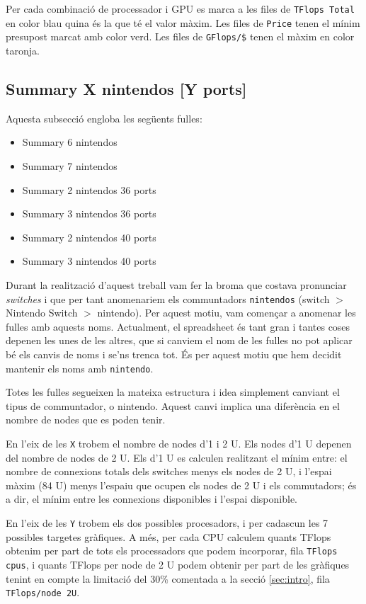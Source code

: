 Per cada combinació de processador i GPU es marca a les files de \texttt{TFlops Total} en color blau quina és la que té el valor màxim. Les files de \texttt{Price} tenen el mínim presupost marcat amb color verd. Les files de \texttt{GFlops/\$} tenen el màxim en color taronja.

\subsection{Summary X nintendos [Y ports]}
Aquesta subsecció engloba les següents fulles:
\begin{itemize}
    \item Summary 6 nintendos
    \item Summary 7 nintendos
    \item Summary 2 nintendos 36 ports
    \item Summary 3 nintendos 36 ports
    \item Summary 2 nintendos 40 ports
    \item Summary 3 nintendos 40 ports
\end{itemize}

Durant la realització d'aquest treball vam fer la broma que costava pronunciar \textit{switches} i que per tant anomenariem els communtadors \texttt{nintendos} (switch $>$ Nintendo Switch $>$ nintendo). Per aquest motiu, vam començar a anomenar les fulles amb aquests noms.
Actualment, el spreadsheet és tant gran i tantes coses depenen les unes de les altres, que si canviem el nom de les fulles no pot aplicar bé els canvis de noms i se'ns trenca tot. És per aquest motiu que hem decidit mantenir els noms amb \texttt{nintendo}.

Totes les fulles segueixen la mateixa estructura i idea simplement canviant el tipus de communtador, o nintendo. Aquest canvi implica una diferència en el nombre de nodes que es poden tenir.

En l'eix de les \texttt{X} trobem el nombre de nodes d'1 i 2 U. Els nodes d'1 U depenen del nombre de nodes de 2 U. Els d'1 U es calculen realitzant el mínim entre: el nombre de connexions totals dels switches menys els nodes de 2 U, i l'espai màxim (84 U) menys l'espaiu que ocupen els nodes de 2 U i els commutadors; és a dir, el mínim entre les connexions disponibles i l'espai disponible. 

En l'eix de les \texttt{Y} trobem els dos possibles procesadors, i per cadascun les 7 possibles targetes gràfiques. A més, per cada CPU calculem quants TFlops obtenim per part de tots els processadors que podem incorporar, fila \texttt{TFlops cpus}, i quants TFlops per node de 2 U podem obtenir per part de les gràfiques tenint en compte la limitació del 30\% comentada a la secció \ref{sec:intro}, fila \texttt{TFlops/node 2U}.

